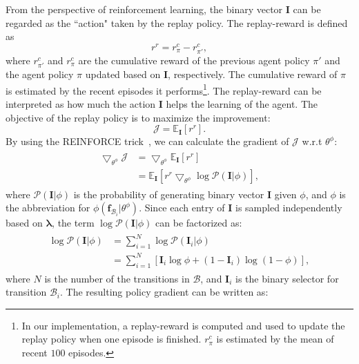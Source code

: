 \documentclass{article}
\begin{document}
From the perspective of reinforcement learning, the binary vector \textbf{I} can be regarded as the ``action" taken by the replay policy. The replay-reward is defined as
\begin{equation}
\label{label:eqn3}
    r^{r} = r^{c}_{\pi} - r^{c}_{\pi'},
\end{equation}
where $r^{c}_{\pi'}$ and $r^{c}_{\pi}$ are the cumulative reward of the previous agent policy $\pi'$ and the agent policy $\pi$ updated based on \textbf{I}, respectively. The cumulative reward of $\pi$ is estimated by the recent episodes it performs\footnote{In our implementation, a replay-reward is computed and used to update the replay policy when one episode is finished. $r^{c}_{\pi}$ is estimated by the mean of recent $100$ episodes.}. The replay-reward can be interpreted as how much the action \textbf{I} helps the learning of the agent. The objective of the replay policy is to maximize the improvement:
\begin{equation}
    \mathcal{J} = \mathbb{E}_{\textbf{I}}[r^{r}].
\end{equation}
By using the REINFORCE trick~\cite{williams1992simple}, we can calculate the gradient of $\mathcal{J}$ w.r.t $\theta^\phi$:
\begin{align}
\begin{split}
    \bigtriangledown_{\theta^\phi} \mathcal{J} & = \bigtriangledown_{\theta^\phi} \mathbb{E}_{\textbf{I}}[r^{r}] \\
    & = \mathbb{E}_{\textbf{I}}[r^{r} \bigtriangledown_{\theta^\phi} \log \mathcal{P}(\textbf{I}|\phi)],
\end{split}
\end{align}
where $\mathcal{P}(\textbf{I}|\phi)$ is the probability of generating binary vector \textbf{I} given $\phi$, and $\phi$ is the abbreviation for $\phi(\textbf{f}_{\mathcal{B}_i}|\theta^\phi)$. Since each entry of \textbf{I} is sampled independently based on $\bm{\lambda}$, the term $\log \mathcal{P}(\textbf{I}|\phi)$ can be factorized as:
\begin{align}
\begin{split}
    \log \mathcal{P}(\textbf{I}|\phi) & =\sum_{i=1}^{N} \log \mathcal{P}(\textbf{I}_i|\phi) \\
    & = \sum_{i=1}^{N} [\textbf{I}_i \log \phi + (1-\textbf{I}_i) \log (1-\phi)],
\end{split}
\end{align}
where $N$ is the number of the transitions in $\mathcal{B}$, and $\textbf{I}_i$ is the binary selector for transition $\mathcal{B}_i$. The resulting policy gradient can be written as:
\end{document}
